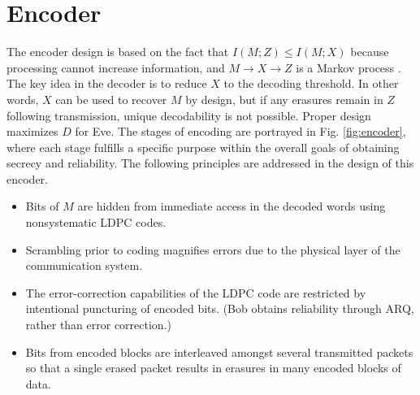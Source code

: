 \documentclass[10pt,twocolumn,twoside]{IEEEtran} \newlength{\pic}
\theoremstyle{definition}
\theoremstyle{remark}
\theoremstyle{plain}
\begin{document}
\section{Encoder}\label{sec:encoder}

The encoder design is based on the fact that $I(M;Z) \leq I(M;X)$ because processing cannot increase information, and $M\rightarrow X\rightarrow Z$ is a Markov process \cite{Cover}. The key idea in the decoder is to reduce $X$ to the decoding threshold. In other words, $X$ can be used to recover $M$ by design, but if any erasures remain in $Z$ following transmission, unique decodability is not possible. Proper design maximizes $D$ for Eve. The stages of encoding are portrayed in Fig. \ref{fig:encoder}, where each stage fulfills a specific purpose within the overall goals of obtaining secrecy and reliability. The following principles are addressed in the design of this encoder.
\begin{itemize}
  \item Bits of $M$ are hidden from immediate access in the decoded words using nonsystematic LDPC codes.
  \item Scrambling prior to coding magnifies errors due to the physical layer of the communication system.
  \item The error-correction capabilities of the LDPC code are restricted by intentional puncturing of encoded bits. (Bob obtains reliability through ARQ, rather than error correction.)
  \item Bits from encoded blocks are interleaved amongst several transmitted packets so that a single erased packet results in erasures in many encoded blocks of data.
\end{itemize}
\end{document}
